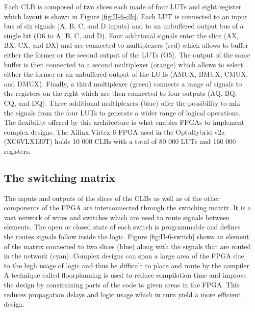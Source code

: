       Each CLB is composed of two slices each made of four LUTs and eight register which layout is shown in Figure \ref{fig:II-6-clb}. Each LUT is connected to an input bus of six signals (A, B, C, and D inputs) and to an unbuffered output bus of a single bit (O6 to A, B, C, and D). Four additional signals enter the slice (AX, BX, CX, and DX) and are connected to multiplexers (red) which allows to buffer either the former or the second output of the LUTs (O5). The output of the same buffer is then connected to a second multiplexer (orange) which allows to select either the former or an unbuffered output of the LUTs (AMUX, BMUX, CMUX, and DMUX). Finally, a third multiplexer (green) connects a range of signals to the registers on the right which are then connected to four outputs (AQ, BQ, CQ, and DQ). Three additional multiplexers (blue) offer the possibility to mix the signals from the four LUTs to generate a wider range of logical operations. The flexibility offered by this architecture is what enables FPGAs to implement complex designs. The Xilinx Virtex-6 FPGA used in the OptoHybrid v2a (XC6VLX130T) holds 10 000 CLBs with a total of 80 000 LUTs and 160 000 registers.

    \subsection{The switching matrix}

      The inputs and outputs of the slices of the CLBs as well as of the other components of the FPGA are interconnected through the switching matrix. It is a vast network of wires and switches which are used to route signals between elements. The open or closed state of each switch is programmable and defines the routes signals follow inside the logic. Figure \ref{fig:II-6-switch} shows an element of the matrix connected to two slices (blue) along with the signals that are routed in the network (cyan). Complex designs can span a large area of the FPGA due to the high usage of logic and thus be difficult to place and route by the compiler. A technique called floorplanning is used to reduce compilation time and improve the design by constraining parts of the code to given areas in the FPGA. This reduces propagation delays and logic usage which in turn yield a more efficient design.

